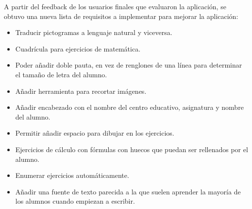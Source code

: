 A partir del feedback de los usuarios finales que evaluaron la aplicación, se obtuvo una nueva lista de requisitos a implementar para mejorar la aplicación:

\begin{itemize}
    \item Traducir pictogramas a lenguaje natural y viceversa.
    \item Cuadrícula para ejercicios de matemática.
    \item Poder añadir doble pauta, en vez de renglones de una línea para determinar el tamaño de letra del alumno.
    \item Añadir herramienta para recortar imágenes.
    \item Añadir encabezado con el nombre del centro educativo, asignatura y nombre del alumno.
    \item Permitir añadir espacio para dibujar en los ejercicios.
    \item Ejercicios de cálculo con fórmulas con huecos que puedan ser rellenados por el alumno.
    \item Enumerar ejercicios automáticamente.
    \item Añadir una fuente de texto parecida a la que suelen aprender la mayoría de los alumnos cuando empiezan a escribir.
\end{itemize}